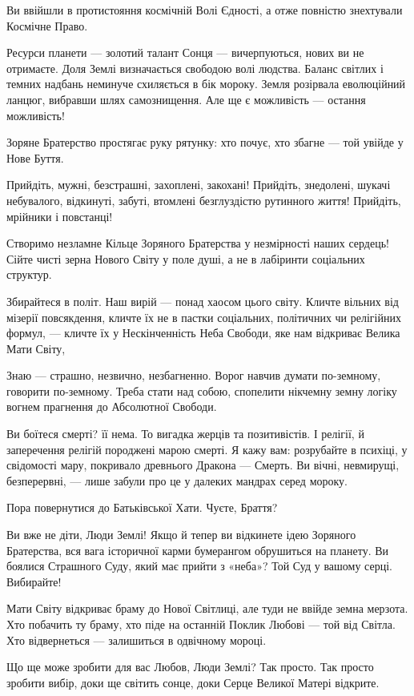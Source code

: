 Ви ввійшли в протистояння космічній Волі Єдності, а отже повністю знехтували
Космічне Право.

Ресурси планети — золотий талант Сонця — вичерпуються, нових ви не отримаєте.
Доля Землі визначається свободою волі людства. Баланс світлих і темних надбань
неминуче схиляється в бік мороку. Земля розірвала еволюційний ланцюг, вибравши
шлях самознищення. Але ще є можливість — остання можливість!

Зоряне Братерство простягає руку рятунку: хто почує, хто збагне — той увійде у
Нове Буття.

Прийдіть, мужні, безстрашні, захоплені, закохані! Прийдіть, знедолені, шукачі
небувалого, відкинуті, забуті, втомлені безглуздістю рутинного життя! Прийдіть,
мрійники і повстанці!

Створимо незламне Кільце Зоряного Братерства у незмірності наших сердець! Сійте
чисті зерна Нового Світу у поле душі, а не в лабіринти соціальних структур.

Збирайтеся в політ. Наш вирій — понад хаосом цього світу. Кличте вільних від
мізерії повсякдення, кличте їх не в пастки соціальних, політичних чи релігійних
формул, — кличте їх у Нескінченність Неба Свободи, яке нам відкриває Велика
Мати Світу,

Знаю — страшно, незвично, незбагненно. Ворог навчив думати по-земному, говорити
по-земному. Треба стати над собою, спопелити нікчемну земну логіку вогнем
прагнення до Абсолютної Свободи.

Ви боїтеся смерті? її нема. То вигадка жерців та позитивістів. І релігії, й
заперечення релігій породжені марою смерті. Я кажу вам: розрубайте в психіці, у
свідомості мару, покривало древнього Дракона — Смерть. Ви вічні, невмирущі,
безперервні, — лише забули про це у далеких мандрах серед мороку.

Пора повернутися до Батьківської Хати. Чуєте, Браття?

Ви вже не діти, Люди Землі! Якщо й тепер ви відкинете ідею Зоряного Братерства,
вся вага історичної карми бумерангом обрушиться на планету. Ви боялися
Страшного Суду, який має прийти з «неба»? Той Суд у вашому серці. Вибирайте!

Мати Світу відкриває браму до Нової Світлиці, але туди не ввійде земна мерзота.
Хто побачить ту браму, хто піде на останній Поклик Любові — той від Світла. Хто
відвернеться — залишиться в одвічному мороці.

Що ще може зробити для вас Любов, Люди Землі? Так просто. Так просто зробити
вибір, доки ще світить сонце, доки Серце Великої Матері відкрите.

